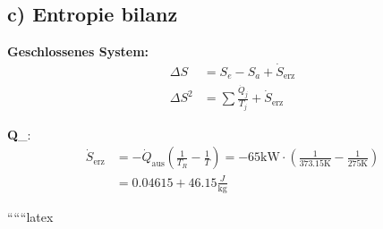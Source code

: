 \subsection*{c) Entropie bilanz}
\textbf{Geschlossenes System:}
\begin{align*}
\Delta S &= S_e - S_a + \dot{S}_{\text{erz}} \\
\Delta S^2 &= \sum \frac{\dot{Q}_j}{T_j} + \dot{S}_{\text{erz}}
\end{align*}

\textbf{Q}_{}:
\begin{align*}
\dot{S}_{\text{erz}} &= -\dot{Q}_{\text{aus}} \left( \frac{1}{T_R} - \frac{1}{T} \right) = -65 \text{kW} \cdot \left( \frac{1}{373.15 \text{K}} - \frac{1}{275 \text{K}} \right) \\
&= 0.04615 + 46.15 \frac{J}{\text{kg}}
\end{align*}

``````latex